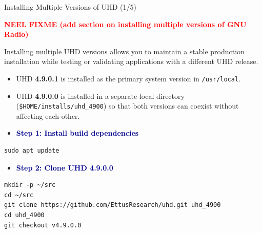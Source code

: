 \begin{frame}[fragile]{Installing Multiple Versions of UHD (1/5)}

\textbf{\textcolor{red}{NEEL FIXME (add section on installing multiple versions of GNU Radio)}}

\footnotesize

Installing multiple UHD versions allows you to maintain a stable production
installation while testing or validating applications with a different UHD
release.

\begin{itemize}
    \item UHD \textbf{4.9.0.1} is installed as the primary system version in
    \texttt{/usr/local}.

    \item UHD \textbf{4.9.0.0} is installed in a separate local directory
    (\texttt{\$HOME/installs/uhd\_4900}) so that both versions can coexist
    without affecting each other.
\end{itemize}

\vspace{0.2cm}

\begin{itemize}
    \item \textbf{\textcolor{DarkBlue}{Step 1: Install build dependencies}}
\end{itemize}

\scriptsize
\begin{Verbatim}[xleftmargin=3.8em]
sudo apt update
\end{Verbatim}

\footnotesize
\vspace{0.5cm}
\begin{itemize}
    \item \textbf{\textcolor{DarkBlue}{Step 2: Clone UHD 4.9.0.0}}
\end{itemize}

\scriptsize
\begin{Verbatim}[xleftmargin=3.8em]
mkdir -p ~/src
cd ~/src
git clone https://github.com/EttusResearch/uhd.git uhd_4900
cd uhd_4900
git checkout v4.9.0.0
\end{Verbatim}

\end{frame}